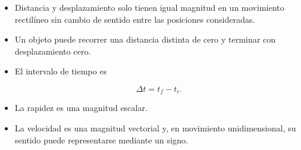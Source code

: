 \begin{resumen}
\begin{itemize}
    \item Distancia y desplazamiento solo tienen igual magnitud en un
    movimiento rectilíneo sin cambio de sentido entre las posiciones
    consideradas.

    \item Un objeto puede recorrer una distancia distinta de cero y terminar
    con desplazamiento cero.

    \item El intervalo de tiempo es

    \[
    \boxed{\Delta t=t_f-t_i}.
    \]

    \item La rapidez es una magnitud escalar.

    \item La velocidad es una magnitud vectorial y, en movimiento
    unidimensional, su sentido puede representarse mediante un signo.

\end{itemize}

\end{resumen}